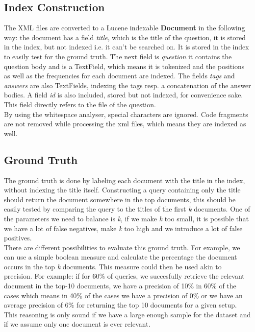 \documentclass{article}
\begin{document}
\subsection{Index Construction}
The XML files are converted to a Lucene indexable \textbf{Document} in the following way: the document has a field \textit{title}, which is the title of the question, it is stored in the index, but not indexed i.e. it can't be searched on. It is stored in the index to easily test for the ground truth. The next field is \textit{question} it contains the question body and is a TextField, which means it is tokenized and the positions as well as the frequencies for each document are indexed. The fields \textit{tags} and \textit{answers} are also TextFields, indexing the tags resp. a concatenation of the answer bodies. A field \textit{id} is also included, stored but not indexed, for convenience sake. This field directly refers to the file of the question.\\

By using the whitespace analyser, special characters are ignored. Code fragments are not removed while processing the xml files, which means they are indexed as well.

\subsection{Ground Truth}
The ground truth is done by labeling each document with the title in the index, without indexing the title itself. Constructing a query containing only the title should return the document somewhere in the top documents, this should be easily tested by comparing the query to the titles of the first \textit{k} documents. One of the parameters we need to balance is \textit{k}, if we make \textit{k} too small, it is possible that we have a lot of false negatives, make \textit{k} too high and we introduce a lot of false positives.\\

There are different possibilities to evaluate this ground truth. For example, we can use a simple boolean measure and calculate the percentage the document occurs in the top \textit{k} documents. This measure could then be used akin to precision. For example: if for 60\% of queries, we succesfully retrieve the relevant document in the top-10 documents, we have a precision of 10\% in 60\% of the cases which means in 40\% of the cases we have a precision of 0\% or we have an average precision of 6\% for returning the top 10 documents for a given setup. This reasoning is only sound if we have a large enough sample for the dataset and if we assume only one document is ever relevant.\\ 
\end{document}
